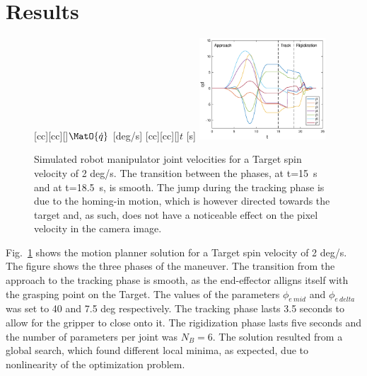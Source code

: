 \section{Results}
\label{sec:results}
%
%
%
%
%
\begin{figure}[t!]
[cc][cc][\FontFigB]{$\MatO{\dot{q}}$ [deg/s]}
[cc][cc][\FontFigB]{$t$ [s]}
\centering\includegraphics[angle=0,width=0.42\textwidth]{./figures/Joint_vel_2degs}
\caption{Simulated robot manipulator joint velocities for a Target spin velocity of 2 deg/s. The transition between the phases, at t=15~s and at t=18.5~s, is smooth. The jump during the tracking phase is due to the homing-in motion, which is however directed towards the target and, as such, does not have a noticeable effect on the pixel velocity in the camera image.}
\label{fig:Joint_vel_2degs}
\end{figure}
%
Fig.~\ref{fig:Joint_vel_2degs} shows the motion planner solution for a Target spin velocity of 2 deg/s. The figure shows the three phases of the maneuver. The transition from the approach to the tracking phase is smooth, as the end-effector alligns itself with the grasping point on the Target. The values of the parameters $\phi_{e \: mid}$ and $\phi_{e \: delta}$  was set to 40 and 7.5 deg respectively. The tracking phase lasts 3.5 seconds to allow for the gripper to close onto it. The rigidization phase  lasts five seconds and the number of parameters per joint was $N_B=6$. The solution resulted from a global search,  which found different local minima, as expected, due to nonlinearity of the optimization problem. 


